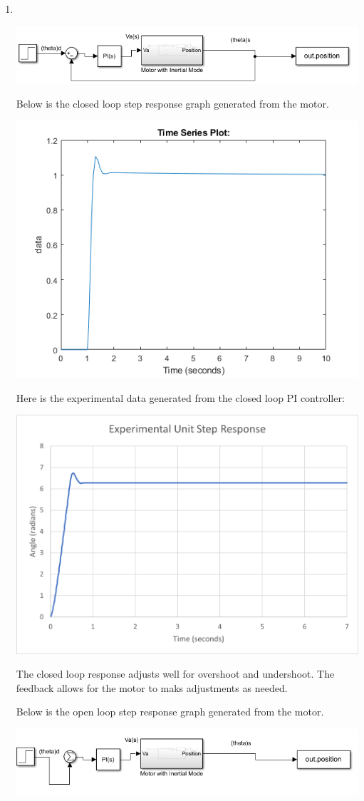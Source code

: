 \documentclass{article}
\begin{document}
\begin{enumerate}
        \item \ \\
        \begin{center}
            \includegraphics[width=0.8\linewidth]{closedLoop.PNG}
        \end{center}
        Below is the closed loop step response graph generated from the motor.
        \begin{center}
            \includegraphics[width=0.6\linewidth]{closedLoopResponse.png}
        \end{center}
        Here is the experimental data generated from the closed loop PI controller:
        \begin{center}
            \includegraphics[width=0.6\linewidth]{experimentalClosedLoopResponse.png}
        \end{center}
        The closed loop response adjusts well for overshoot and undershoot. The feedback allows for the motor to maks adjustments as needed. 

        Below is the open loop step response graph generated from the motor.
        \begin{center}
            \includegraphics[width=0.8\linewidth]{openLoop.PNG}
        \end{center}
        

\end{enumerate}
\end{document}
